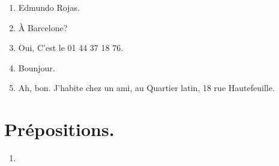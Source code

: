 \begin{enumerate}[label=\alph*)]
    \item Edmundo Rojas.
    \item À Barcelone?
    \item Oui, C'est le 01 44 37  18 76.
    \item Bounjour.
    \item Ah, bon. J'habite chez un ami, au Quartier latin, 18 rue Hautefeuille.
\end{enumerate}

\section{Prépositions.}

\begin{enumerate}
    \item 
\end{enumerate}